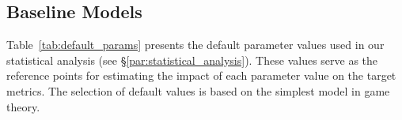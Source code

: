 \subsection{Baseline Models}
\label{app:stat_analisys:baseline_models}
Table~\ref{tab:default_params} presents the default parameter values used in our statistical analysis (see \S\ref{par:statistical_analysis}). These values serve as the reference points for estimating the impact of each parameter value on the target metrics. The selection of default values is based on the simplest model in game theory.

\begin{table}[t]
\centering
\caption{Default parameter values used in the statistical analysis. 
$T=\infty$ means a very large value of $T$, unknown to the players.
CI = Complete Information.
MA = Textual messages allowed.
}



\end{table}
